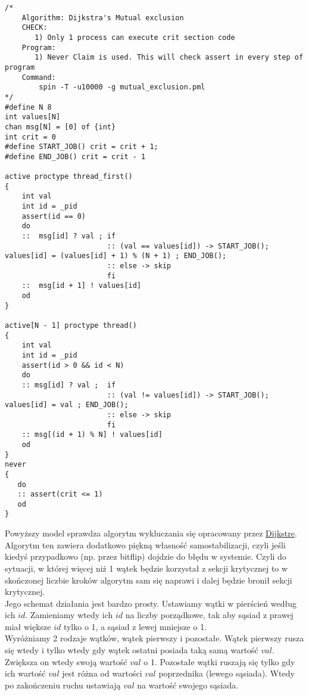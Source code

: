 \begin{lstlisting}[language=Promela,style=myPromela]
/*
    Algorithm: Dijkstra's Mutual exclusion
    CHECK:
       1) Only 1 process can execute crit section code
    Program:
       1) Never Claim is used. This will check assert in every step of program
    Command:
        spin -T -u10000 -g mutual_exclusion.pml
*/
#define N 8
int values[N]
chan msg[N] = [0] of {int}
int crit = 0
#define START_JOB() crit = crit + 1;
#define END_JOB() crit = crit - 1

active proctype thread_first()
{
    int val
    int id = _pid
    assert(id == 0)
    do
    ::  msg[id] ? val ; if
                        :: (val == values[id]) -> START_JOB(); values[id] = (values[id] + 1) % (N + 1) ; END_JOB();
                        :: else -> skip
                        fi
    ::  msg[id + 1] ! values[id]
    od
}

active[N - 1] proctype thread()
{
    int val
    int id = _pid
    assert(id > 0 && id < N)
    do
    :: msg[id] ? val ;  if
                        :: (val != values[id]) -> START_JOB(); values[id] = val ; END_JOB();
                        :: else -> skip
                        fi
    :: msg[(id + 1) % N] ! values[id]
    od
}
never
{
   do
   :: assert(crit <= 1)
   od
}
\end{lstlisting}

Powyższy model sprawdza algorytm wykluczania się opracowany przez \href{http://citeseerx.ist.psu.edu/viewdoc/download?doi=10.1.1.93.314&rep=rep1&type=pdf}{Dijkstre}. Algorytm ten zawiera dodatkowo piękną własność samostabilizacji, czyli jeśli kiedyś przypadkowo (np. przez bitflip) dojdzie do błędu w systemie. Czyli do sytuacji, w której więcej niż 1 wątek będzie korzystał z sekcji krytycznej to w skończonej liczbie kroków algorytm sam się naprawi i dalej będzie bronił sekcji krytycznej. \\
Jego schemat działania jest bardzo prosty. Ustawiamy wątki w pierścień według ich $id$. Zamieniamy wtedy ich $id$ na liczby porządkowe, tak aby sąsiad z prawej miał większe $id$ tylko o 1, a sąsiad z lewej mniejsze o 1. \\
Wyróżniamy 2 rodzaje wątków, wątek pierwszy i pozostałe. Wątek pierwszy rusza się wtedy i tylko wtedy gdy wątek ostatni posiada taką samą wartość $val$. Zwiększa on wtedy swoją wartość $val$ o 1. Pozostałe wątki ruszają się tylko gdy ich wartość $val$ jest różna od wartości $val$ poprzednika (lewego sąsiada). Wtedy po zakończeniu ruchu ustawiają $val$ na wartość swojego sąsiada.